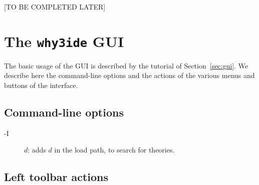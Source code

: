 
[TO BE COMPLETED LATER]

\section{The \texttt{why3ide} GUI}
\label{sec:ideref}

The basic usage of the GUI is described by the tutorial of
Section~\ref{sec:gui}. We describe here the command-line options and
the actions of the various menus and buttons of the interface.

\subsection{Command-line options}

\begin{description}
\item[-I] $d$: adds $d$ in the load path, to search for theories.
\end{description}

\subsection{Left toolbar actions}

